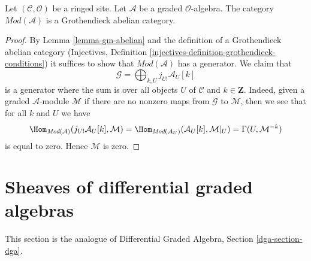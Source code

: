 \begin{lemma}
\label{lemma-gm-grothendieck-abelian}
Let $(\mathcal{C}, \mathcal{O})$ be a ringed site.
Let $\mathcal{A}$ be a graded $\mathcal{O}$-algebra.
The category $\textit{Mod}(\mathcal{A})$ is a Grothendieck abelian category.
\end{lemma}

\begin{proof}
By Lemma \ref{lemma-gm-abelian} and the definition of a Grothendieck
abelian category
(Injectives, Definition \ref{injectives-definition-grothendieck-conditions})
it suffices to
show that $\textit{Mod}(\mathcal{A})$ has a generator. We claim that
$$
\mathcal{G} = \bigoplus\nolimits_{k, U} j_{U!}\mathcal{A}_U[k]
$$
is a generator where the sum is over all objects $U$ of $\mathcal{C}$
and $k \in \mathbf{Z}$. Indeed, given a graded $\mathcal{A}$-module
$\mathcal{M}$ if there are no nonzero maps from $\mathcal{G}$ to $\mathcal{M}$,
then we see that for all $k$ and $U$ we have
$$
\Hom_{\textit{Mod}(\mathcal{A})}(j_{U!}\mathcal{A}_U[k], \mathcal{M}) =
\Hom_{\textit{Mod}(\mathcal{A}_U)}(\mathcal{A}_U[k], \mathcal{M}|_U) =
\Gamma(U, \mathcal{M}^{-k})
$$
is equal to zero. Hence $\mathcal{M}$ is zero.
\end{proof}









\section{Sheaves of differential graded algebras}
\label{section-dga}

\noindent
This section is the analogue of
Differential Graded Algebra, Section \ref{dga-section-dga}.

